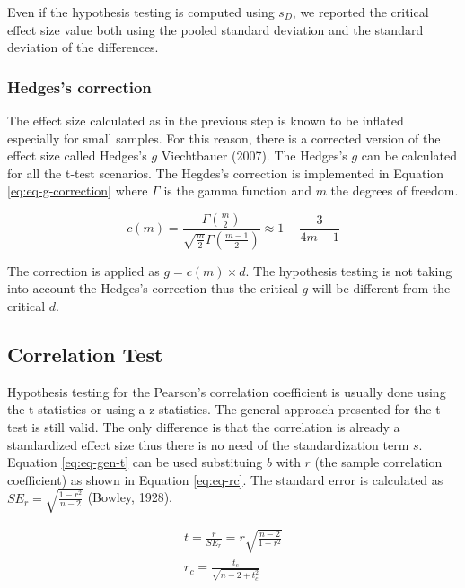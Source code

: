 \documentclass[
  man]{apa7}
\begin{document}
Even if the hypothesis testing is computed using \(s_D\), we reported the critical effect size value both using the pooled standard deviation and the standard deviation of the differences.

\hypertarget{hedgess-correction}{%
\subsubsection{Hedges's correction}\label{hedgess-correction}}

The effect size calculated as in the previous step is known to be inflated especially for small samples. For this reason, there is a corrected version of the effect size called Hedges's \(g\) Viechtbauer (2007). The Hedges's \(g\) can be calculated for all the t-test scenarios. The Hegdes's correction is implemented in Equation \eqref{eq:eq-g-correction} where \(\Gamma\) is the gamma function and \(m\) the degrees of freedom.

\begin{equation}
\label{eq:eq-g-correction}
c(m) = \frac{\Gamma\left(\frac{m}{2}\right)}{\sqrt{\frac{m}{2}} \Gamma\left(\frac{m-1}{2}\right)} \approx 1 - \frac{3}{4m - 1}
\end{equation}

The correction is applied as \(g = c(m) \times d\). The hypothesis testing is not taking into account the Hedges's correction thus the critical \(g\) will be different from the critical \(d\).

\hypertarget{correlation-test}{%
\subsection{Correlation Test}\label{correlation-test}}

Hypothesis testing for the Pearson's correlation coefficient is usually done using the t statistics or using a z statistics. The general approach presented for the t-test is still valid. The only difference is that the correlation is already a standardized effect size thus there is no need of the standardization term \(s\). Equation \eqref{eq:eq-gen-t} can be used substituing \(b\) with \(r\) (the sample correlation coefficient) as shown in Equation \eqref{eq:eq-rc}. The standard error is calculated as \(SE_r = \sqrt{\frac{1 - r^2}{n - 2}}\) (Bowley, 1928).

\begin{equation}
\label{eq:eq-rc}
    \begin{gathered}
        t = \frac{r}{SE_r} = r \sqrt{\frac{n - 2}{1 - r^2}} \\
        r_c = \frac{t_c}{\sqrt{n - 2 + t_c^2}}
    \end{gathered}
\end{equation}
\end{document}
